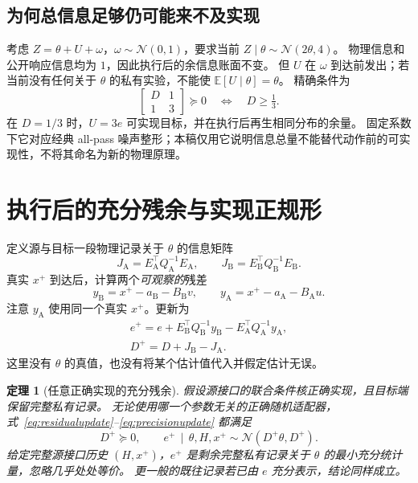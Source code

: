 \documentclass[UTF8,fontset=fandol,11pt,a4paper]{ctexart}
\newcommand{\N}{\mathcal N}
\newcommand{\E}{\mathbb E}
\newcommand{\given}{\,\mid\,}
\newtheorem{theorem}{定理}[section]
\theoremstyle{definition}
\theoremstyle{remark}
\numberwithin{equation}{section}
\begin{document}
\subsection{为何总信息足够仍可能来不及实现}
考虑 $Z=\theta+U+\omega$，$\omega\sim\N(0,1)$，要求当前 $Z\mid\theta\sim\N(2\theta,4)$。
物理信息和公开响应信息均为 $1$，因此执行后的余信息账面不变。
但 $U$ 在 $\omega$ 到达前发出；若当前没有任何关于 $\theta$ 的私有实验，不能使 $\E[U\mid\theta]=\theta$。
精确条件为
\begin{equation}
 \begin{bmatrix}D&1\\1&3\end{bmatrix}\succeq0
 \quad\Longleftrightarrow\quad D\ge\tfrac13.
 \label{eq:timingexample}
\end{equation}
在 $D=1/3$ 时，$U=3e$ 可实现目标，并在执行后再生相同分布的余量。
固定系数下它对应经典 all-pass 噪声整形；本稿仅用它说明信息总量不能替代动作前的可实现性，不将其命名为新的物理原理。

\section{执行后的充分残余与实现正规形}
\label{sec:normal}

定义源与目标一段物理记录关于 $\theta$ 的信息矩阵
\begin{equation}
 J_{\mathrm A}=E_{\mathrm A}^\top Q_{\mathrm A}^{-1}E_{\mathrm A},\qquad
 J_{\mathrm B}=E_{\mathrm B}^\top Q_{\mathrm B}^{-1}E_{\mathrm B}.
\end{equation}
真实 $x^+$ 到达后，计算两个\emph{可观察的}残差
\begin{equation}
 y_{\mathrm B}=x^+-a_{\mathrm B}-B_{\mathrm B}v,
 \qquad
 y_{\mathrm A}=x^+-a_{\mathrm A}-B_{\mathrm A}u.
\end{equation}
注意 $y_{\mathrm A}$ 使用同一个真实 $x^+$。更新为
\begin{align}
 \boxed{e^+=e+E_{\mathrm B}^\top Q_{\mathrm B}^{-1}y_{\mathrm B}
              -E_{\mathrm A}^\top Q_{\mathrm A}^{-1}y_{\mathrm A},}
 \label{eq:residualupdate}\\
 \boxed{D^+=D+J_{\mathrm B}-J_{\mathrm A}.}
 \label{eq:precisionupdate}
\end{align}
这里没有 $\theta$ 的真值，也没有将某个估计值代入并假定估计无误。

\begin{theorem}[任意正确实现的充分残余]
\label{thm:rigidity}
假设源接口的联合条件核正确实现，且目标端保留完整私有记录。
无论使用哪一个参数无关的正确随机适配器，式~\eqref{eq:residualupdate}--\eqref{eq:precisionupdate} 都满足
\begin{equation}
 D^+\succeq0,\qquad
 e^+\given\theta,H,x^+\sim\N(D^+\theta,D^+).
 \label{eq:invariant-next}
\end{equation}
给定完整源接口历史 $(H,x^+)$，$e^+$ 是剩余完整私有记录关于 $\theta$ 的最小充分统计量，忽略几乎处处等价。
更一般的既往记录若已由 $e$ 充分表示，结论同样成立。
\end{theorem}
\end{document}
